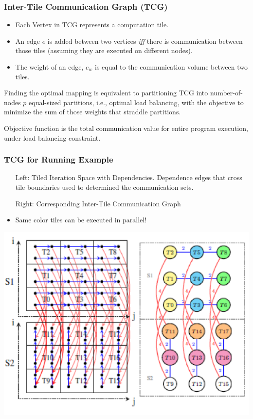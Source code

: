 \documentclass{beamer}
\newcommand{\emp}[1]{\textcolor{DikuRed}{ #1}}
\begin{document}
\begin{frame}[fragile,t]
  \frametitle{Inter-Tile Communication Graph (TCG)}


\begin{itemize}
    \item \emp{Each Vertex} in TCG represents a computation tile. 
    \item \emp{An edge} $e$ is added between two vertices {\em iff}
            there is communication between those tiles (assuming they
                are executed on different nodes).
    \item \emp{The weight} of an edge, $e_w$ is equal to the communication
            volume between two tiles.
\end  {itemize}

\smallskip
Finding the optimal mapping is equivalent to partitioning TCG
into number-of-nodes $p$ equal-sized partitions, i.e., optimal 
load balancing, with the objective to minimize the sum of those
weights that straddle partitions.\medskip

Objective function is the total communication value for entire 
program execution, under load balancing constraint.

\end{frame}


\begin{frame}[fragile,t]
  \frametitle{TCG for Running Example}


\begin{itemize}
    \item[Left:] Tiled Iteration Space with Dependencies. Dependence
                    edges that cross tile boundaries used to
                    determined the communication sets.
    \item[Right:] Corresponding Inter-Tile Communication Graph
    \item Same color tiles can be executed in parallel!
\end  {itemize}


\includegraphics[width=49ex]{Figures/TCGforADI}

\end{frame}
\end{document}
